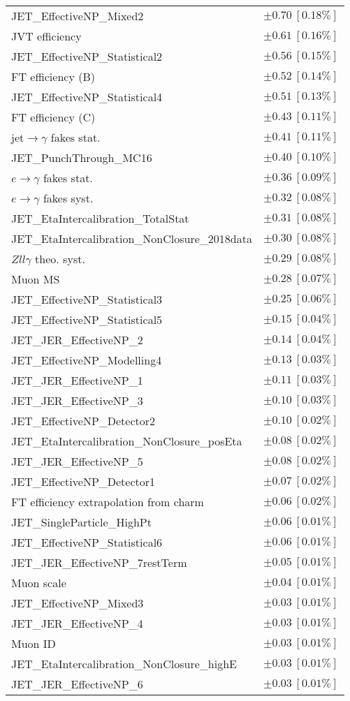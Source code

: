 \begin{tabular}{lr}
JET\_EffectiveNP\_Mixed2 & $\pm 0.70\ [0.18\%]$ \\
JVT efficiency & $\pm 0.61\ [0.16\%]$ \\
JET\_EffectiveNP\_Statistical2 & $\pm 0.56\ [0.15\%]$ \\
FT efficiency (B) & $\pm 0.52\ [0.14\%]$ \\
JET\_EffectiveNP\_Statistical4 & $\pm 0.51\ [0.13\%]$ \\
FT efficiency (C) & $\pm 0.43\ [0.11\%]$ \\
jet$\to\gamma$ fakes stat. & $\pm 0.41\ [0.11\%]$ \\
JET\_PunchThrough\_MC16 & $\pm 0.40\ [0.10\%]$ \\
$e\to\gamma$ fakes stat. & $\pm 0.36\ [0.09\%]$ \\
$e\to\gamma$ fakes syst. & $\pm 0.32\ [0.08\%]$ \\
JET\_EtaIntercalibration\_TotalStat & $\pm 0.31\ [0.08\%]$ \\
JET\_EtaIntercalibration\_NonClosure\_2018data & $\pm 0.30\ [0.08\%]$ \\
$Zll\gamma$ theo. syst. & $\pm 0.29\ [0.08\%]$ \\
Muon MS & $\pm 0.28\ [0.07\%]$ \\
JET\_EffectiveNP\_Statistical3 & $\pm 0.25\ [0.06\%]$ \\
JET\_EffectiveNP\_Statistical5 & $\pm 0.15\ [0.04\%]$ \\
JET\_JER\_EffectiveNP\_2 & $\pm 0.14\ [0.04\%]$ \\
JET\_EffectiveNP\_Modelling4 & $\pm 0.13\ [0.03\%]$ \\
JET\_JER\_EffectiveNP\_1 & $\pm 0.11\ [0.03\%]$ \\
JET\_JER\_EffectiveNP\_3 & $\pm 0.10\ [0.03\%]$ \\
JET\_EffectiveNP\_Detector2 & $\pm 0.10\ [0.02\%]$ \\
JET\_EtaIntercalibration\_NonClosure\_posEta & $\pm 0.08\ [0.02\%]$ \\
JET\_JER\_EffectiveNP\_5 & $\pm 0.08\ [0.02\%]$ \\
JET\_EffectiveNP\_Detector1 & $\pm 0.07\ [0.02\%]$ \\
FT efficiency extrapolation from charm & $\pm 0.06\ [0.02\%]$ \\
JET\_SingleParticle\_HighPt & $\pm 0.06\ [0.01\%]$ \\
JET\_EffectiveNP\_Statistical6 & $\pm 0.06\ [0.01\%]$ \\
JET\_JER\_EffectiveNP\_7restTerm & $\pm 0.05\ [0.01\%]$ \\
Muon scale & $\pm 0.04\ [0.01\%]$ \\
JET\_EffectiveNP\_Mixed3 & $\pm 0.03\ [0.01\%]$ \\
JET\_JER\_EffectiveNP\_4 & $\pm 0.03\ [0.01\%]$ \\
Muon ID & $\pm 0.03\ [0.01\%]$ \\
JET\_EtaIntercalibration\_NonClosure\_highE & $\pm 0.03\ [0.01\%]$ \\
JET\_JER\_EffectiveNP\_6 & $\pm 0.03\ [0.01\%]$ \\
\hline
\end{tabular}
